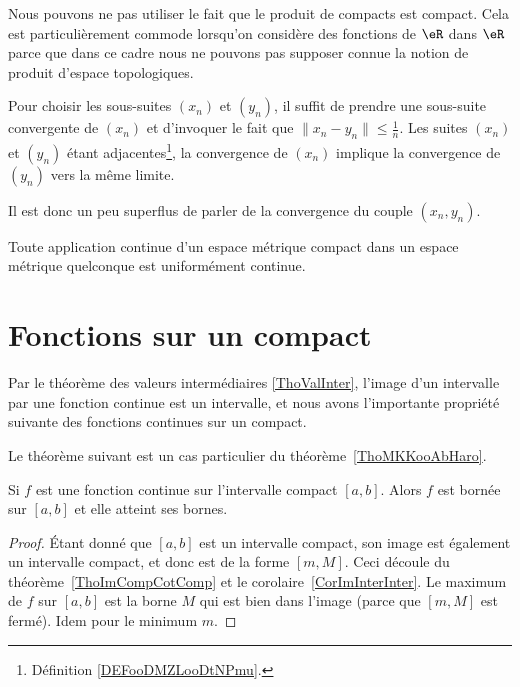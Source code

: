 \begin{remark}
    Nous pouvons ne pas utiliser le fait que le produit de compacts est compact. Cela est particulièrement commode lorsqu'on considère des fonctions de \( \eR\) dans \( \eR\) parce que dans ce cadre nous ne pouvons pas supposer connue la notion de produit d'espace topologiques.

    Pour choisir les sous-suites \( (x_n)\) et \( (y_n)\), il suffit de prendre une sous-suite convergente de \( (x_n)\) et d'invoquer le fait que \( \| x_n-y_n \|\leq \frac{1}{ n }\). Les suites \( (x_n)\) et \( (y_n)\) étant adjacentes\footnote{Définition \ref{DEFooDMZLooDtNPmu}.}, la convergence de \( (x_n)\) implique la convergence de \( (y_n)\) vers la même limite.

    Il est donc un peu superflus de parler de la convergence du couple \( (x_n,y_n)\).
\end{remark}

\begin{proposition}     \label{PROPooBWUFooYhMlDp}
    Toute application continue d'un espace métrique compact dans un espace métrique quelconque est uniformément continue.
\end{proposition}

\section{Fonctions sur un compact}

Par le théorème des valeurs intermédiaires \ref{ThoValInter}, l'image d'un intervalle par une fonction continue est un intervalle, et nous avons l'importante propriété suivante des fonctions continues sur un compact.

Le théorème suivant est un cas particulier du théorème~\ref{ThoMKKooAbHaro}.
\begin{theorem}
    Si $f$ est une fonction continue sur l'intervalle compact $[a,b]$. Alors $f$ est bornée sur $[a,b]$ et elle atteint ses bornes.
\end{theorem}

\begin{proof}
    Étant donné que $[a,b]$ est un intervalle compact, son image est également un intervalle compact, et donc est de la forme $[m,M]$. Ceci découle du théorème~\ref{ThoImCompCotComp} et le corolaire~\ref{CorImInterInter}. Le maximum de $f$ sur $[a,b]$ est la borne $M$ qui est bien dans l'image (parce que $[m,M]$ est fermé). Idem pour le minimum $m$.
\end{proof}

